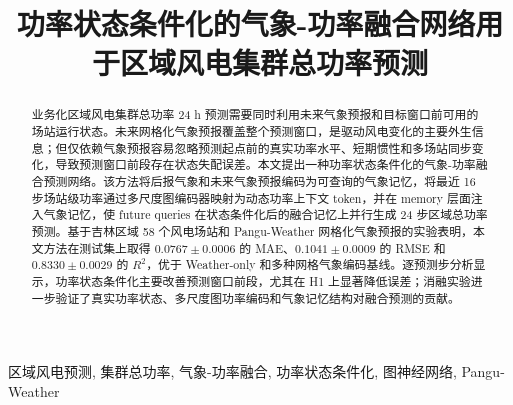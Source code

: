 \documentclass[conference]{IEEEtran}
\begin{document}
\title{功率状态条件化的气象-功率融合网络用于区域风电集群总功率预测}

\author{
}

\maketitle

\begin{abstract}
业务化区域风电集群总功率 24 h 预测需要同时利用未来气象预报和目标窗口前可用的场站运行状态。未来网格化气象预报覆盖整个预测窗口，是驱动风电变化的主要外生信息；但仅依赖气象预报容易忽略预测起点前的真实功率水平、短期惯性和多场站同步变化，导致预测窗口前段存在状态失配误差。本文提出一种功率状态条件化的气象-功率融合预测网络。该方法将后报气象和未来气象预报编码为可查询的气象记忆，将最近 16 步场站级功率通过多尺度图编码器映射为动态功率上下文 token，并在 memory 层面注入气象记忆，使 future queries 在状态条件化后的融合记忆上并行生成 24 步区域总功率预测。基于吉林区域 58 个风电场站和 Pangu-Weather 网格化气象预报的实验表明，本文方法在测试集上取得 \(0.0767\pm0.0006\) 的 MAE、\(0.1041\pm0.0009\) 的 RMSE 和 \(0.8330\pm0.0029\) 的 \(R^2\)，优于 Weather-only 和多种网格气象编码基线。逐预测步分析显示，功率状态条件化主要改善预测窗口前段，尤其在 H1 上显著降低误差；消融实验进一步验证了真实功率状态、多尺度图功率编码和气象记忆结构对融合预测的贡献。
\end{abstract}

\begin{IEEEkeywords}
区域风电预测, 集群总功率, 气象-功率融合, 功率状态条件化, 图神经网络, Pangu-Weather
\end{IEEEkeywords}







\end{document}
